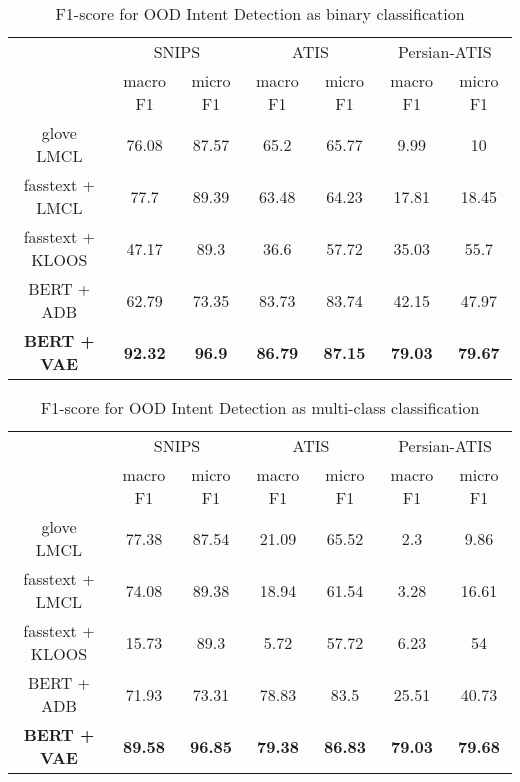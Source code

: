 \documentclass{article}
\begin{document}
\begin{table*}[t!]
	\centering
	\caption{F1-score for OOD Intent Detection as binary classification}
	\label{tab:Table 2}
	\begin{tabular}{ccccccc}
	  \toprule
	  & \multicolumn{2}{c}{SNIPS} & \multicolumn{2}{c}{ATIS} & \multicolumn{2}{c}{Persian-ATIS} \\
	  & macro F1 & micro F1 & macro F1 & micro F1 & macro F1 & micro F1 \\ \hline
	  \midrule
	  glove  LMCL & 76.08 & 87.57 & 65.2 & 65.77 & 9.99 & 10 \\ \hline
	  fasstext + LMCL & 77.7 & 89.39 & 63.48 & 64.23 & 17.81 & 18.45 \\ \hline
	  fasstext + KLOOS & 47.17 & 89.3 & 36.6 & 57.72 & 35.03 & 55.7 \\ \hline
	  BERT + ADB & 62.79 & 73.35 & 83.73 & 83.74 & 42.15 & 47.97\\ \hline
	  \textbf{BERT + VAE} & \textbf{92.32} & \textbf{96.9} & \textbf{86.79} & \textbf{87.15} & \textbf{79.03} & \textbf{79.67} \\ \hline
\end{tabular}
  \end{table*}

  \begin{table*}[t!]
	  \centering
	  \caption{F1-score for OOD Intent Detection as multi-class classification}
	  \label{tab:Table 3}
	  \begin{tabular}{ccccccc}
		\toprule
		& \multicolumn{2}{c}{SNIPS} & \multicolumn{2}{c}{ATIS} & \multicolumn{2}{c}{Persian-ATIS} \\
		& macro F1 & micro F1 & macro F1 & micro F1 & macro F1 & micro F1 \\ \hline
		\midrule
		glove  LMCL & 77.38 & 87.54 & 21.09 & 65.52 & 2.3 & 9.86 \\ \hline
		fasstext + LMCL & 74.08 & 89.38 & 18.94 & 61.54 & 3.28 & 16.61 \\ \hline
		fasstext + KLOOS & 15.73 & 89.3 & 5.72 & 57.72 & 6.23 & 54 \\ \hline
		BERT + ADB & 71.93 & 73.31 & 78.83 & 83.5 & 25.51 & 40.73\\ \hline
		\textbf{BERT + VAE} & \textbf{89.58} & \textbf{96.85} & \textbf{79.38} & \textbf{86.83} & \textbf{79.03} & \textbf{79.68} \\ \hline
\end{tabular}
  \end{table*}
  
\end{document}

